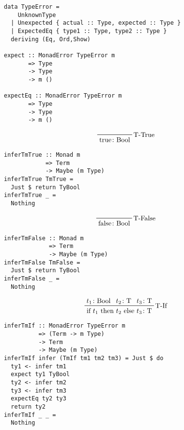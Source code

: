 \documentclass[aspectration=169]{beamer}
\begin{document}
\begin{frame}[fragile]
  \begin{verbatim}
data TypeError =
    UnknownType
  | Unexpected { actual :: Type, expected :: Type }
  | ExpectedEq { type1 :: Type, type2 :: Type }
  deriving (Eq, Ord,Show)

expect :: MonadError TypeError m 
       => Type 
       -> Type 
       -> m ()

expectEq :: MonadError TypeError m 
       => Type 
       -> Type 
       -> m ()
  \end{verbatim}
\end{frame}

\begin{frame}[fragile]
  \begin{displaymath}
    \prftree[r]{T-True}
    {\text{true} \colon \text{Bool}}
  \end{displaymath}
  \begin{verbatim}
inferTmTrue :: Monad m 
            => Term 
            -> Maybe (m Type)
inferTmTrue TmTrue =
  Just $ return TyBool
inferTmTrue _ =
  Nothing
  \end{verbatim}
\end{frame}

\begin{frame}[fragile]
  \begin{displaymath}
    \prftree[r]{T-False}
    {\text{false} \colon \text{Bool}}
  \end{displaymath}
  \begin{verbatim}
inferTmFalse :: Monad m 
             => Term 
             -> Maybe (m Type)
inferTmFalse TmFalse =
  Just $ return TyBool
inferTmFalse _ =
  Nothing
  \end{verbatim}
\end{frame}

\begin{frame}[fragile]
  \begin{displaymath}
    \prftree[r]{T-If}
    {t_1 \colon \text{Bool}}
    {t_2 \colon \text{T}}
    {t_3 \colon \text{T}}
    {\text{if $t_1$ then $t_2$ else $t_3$} \colon \text{T}}
  \end{displaymath}
  \begin{verbatim}
inferTmIf :: MonadError TypeError m 
          => (Term -> m Type)
          -> Term 
          -> Maybe (m Type)
inferTmIf infer (TmIf tm1 tm2 tm3) = Just $ do
  ty1 <- infer tm1
  expect ty1 TyBool
  ty2 <- infer tm2
  ty3 <- infer tm3
  expectEq ty2 ty3
  return ty2
inferTmIf _ _ =
  Nothing
  \end{verbatim}
\end{frame}
\end{document}
